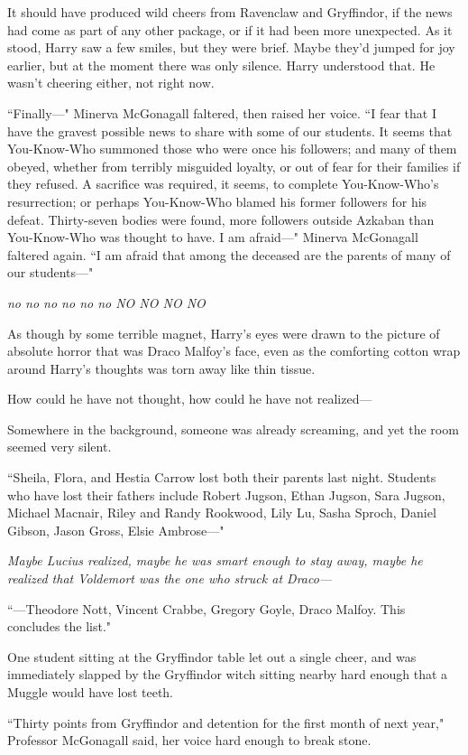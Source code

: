 It should have produced wild cheers from Ravenclaw and Gryffindor, if the news had come as part of any other package, or if it had been more unexpected. As it stood, Harry saw a few smiles, but they were brief. Maybe they'd jumped for joy earlier, but at the moment there was only silence. Harry understood that. He wasn't cheering either, not right now.

``Finally—" Minerva McGonagall faltered, then raised her voice. ``I fear that I have the gravest possible news to share with some of our students. It seems that You-Know-Who summoned those who were once his followers; and many of them obeyed, whether from terribly misguided loyalty, or out of fear for their families if they refused. A sacrifice was required, it seems, to complete You-Know-Who's resurrection; or perhaps You-Know-Who blamed his former followers for his defeat. Thirty-seven bodies were found, more followers outside Azkaban than You-Know-Who was thought to have. I am afraid—" Minerva McGonagall faltered again. ``I am afraid that among the deceased are the parents of many of our students—"

\emph{no no no no no no NO NO NO NO}

As though by some terrible magnet, Harry's eyes were drawn to the picture of absolute horror that was Draco Malfoy's face, even as the comforting cotton wrap around Harry's thoughts was torn away like thin tissue.

How could he have not thought, how could he have not realized—

Somewhere in the background, someone was already screaming, and yet the room seemed very silent.

``Sheila, Flora, and Hestia Carrow lost both their parents last night. Students who have lost their fathers include Robert Jugson, Ethan Jugson, Sara Jugson, Michael Macnair, Riley and Randy Rookwood, Lily Lu, Sasha Sproch, Daniel Gibson, Jason Gross, Elsie Ambrose—"

\emph{Maybe Lucius realized, maybe he was smart enough to stay away, maybe he realized that Voldemort was the one who struck at Draco—}

``—Theodore Nott, Vincent Crabbe, Gregory Goyle, Draco Malfoy. This concludes the list."

One student sitting at the Gryffindor table let out a single cheer, and was immediately slapped by the Gryffindor witch sitting nearby hard enough that a Muggle would have lost teeth.

``Thirty points from Gryffindor and detention for the first month of next year," Professor McGonagall said, her voice hard enough to break stone.

